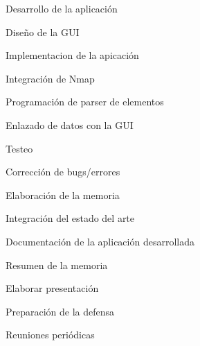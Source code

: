 \begin{numbered}
\begin{numbered}
		\item Desarrollo de la aplicación
		\begin{numbered}
			\item Diseño de la GUI
			\item Implementacion de la apicación
			\begin{numbered}
				\item Integración de Nmap
				\item Programación de parser de elementos
				\item Enlazado de datos con la GUI
			\end{numbered}
			\item Testeo
			\item Corrección de bugs/errores
		\end{numbered}
	\end{numbered}
	
	\item Elaboración de la memoria
	\begin{numbered}
		\item Integración del estado del arte
		\item Documentación de la aplicación desarrollada
		\item Resumen de la memoria
		\item Elaborar presentación
		\item Preparación de la defensa
	\end{numbered}
	
	\item Reuniones periódicas
\end{numbered}

